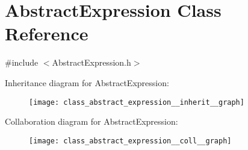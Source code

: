 \hypertarget{class_abstract_expression}{}\section{Abstract\+Expression Class Reference}
\label{class_abstract_expression}


{\ttfamily \#include $<$Abstract\+Expression.\+h$>$}



Inheritance diagram for Abstract\+Expression\+:
\nopagebreak
\begin{figure}[H]
\begin{center}
\leavevmode
\texttt{[image: class\_abstract\_expression\_\_inherit\_\_graph]}
\end{center}
\end{figure}


Collaboration diagram for Abstract\+Expression\+:
\nopagebreak
\begin{figure}[H]
\begin{center}
\leavevmode
\texttt{[image: class\_abstract\_expression\_\_coll\_\_graph]}
\end{center}
\end{figure}
